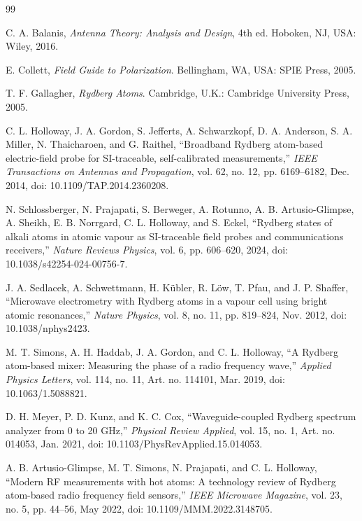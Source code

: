 \documentclass{ieeeaccess}
\begin{document}
\begin{thebibliography}{99}

C. A. Balanis, \emph{Antenna Theory: Analysis and Design}, 4th ed. Hoboken, NJ, USA: Wiley, 2016.

E. Collett, \emph{Field Guide to Polarization}. Bellingham, WA, USA: SPIE Press, 2005.

T. F. Gallagher, \emph{Rydberg Atoms}. Cambridge, U.K.: Cambridge University Press, 2005.

C. L. Holloway, J. A. Gordon, S. Jefferts, A. Schwarzkopf, D. A. Anderson, S. A. Miller, N. Thaicharoen, and G. Raithel, ``Broadband Rydberg atom-based electric-field probe for SI-traceable, self-calibrated measurements,'' \emph{IEEE Transactions on Antennas and Propagation}, vol. 62, no. 12, pp. 6169--6182, Dec. 2014, doi: 10.1109/TAP.2014.2360208.

N. Schlossberger, N. Prajapati, S. Berweger, A. Rotunno, A. B. Artusio-Glimpse, A. Sheikh, E. B. Norrgard, C. L. Holloway, and S. Eckel, ``Rydberg states of alkali atoms in atomic vapour as SI-traceable field probes and communications receivers,'' \emph{Nature Reviews Physics}, vol. 6, pp. 606--620, 2024, doi: 10.1038/s42254-024-00756-7.

J. A. Sedlacek, A. Schwettmann, H. K{\"u}bler, R. L{\"o}w, T. Pfau, and J. P. Shaffer, ``Microwave electrometry with Rydberg atoms in a vapour cell using bright atomic resonances,'' \emph{Nature Physics}, vol. 8, no. 11, pp. 819--824, Nov. 2012, doi: 10.1038/nphys2423.

M. T. Simons, A. H. Haddab, J. A. Gordon, and C. L. Holloway, ``A Rydberg atom-based mixer: Measuring the phase of a radio frequency wave,'' \emph{Applied Physics Letters}, vol. 114, no. 11, Art. no. 114101, Mar. 2019, doi: 10.1063/1.5088821.

D. H. Meyer, P. D. Kunz, and K. C. Cox, ``Waveguide-coupled Rydberg spectrum analyzer from 0 to 20 GHz,'' \emph{Physical Review Applied}, vol. 15, no. 1, Art. no. 014053, Jan. 2021, doi: 10.1103/PhysRevApplied.15.014053.

A. B. Artusio-Glimpse, M. T. Simons, N. Prajapati, and C. L. Holloway, ``Modern RF measurements with hot atoms: A technology review of Rydberg atom-based radio frequency field sensors,'' \emph{IEEE Microwave Magazine}, vol. 23, no. 5, pp. 44--56, May 2022, doi: 10.1109/MMM.2022.3148705.


\end{thebibliography}
\end{document}
